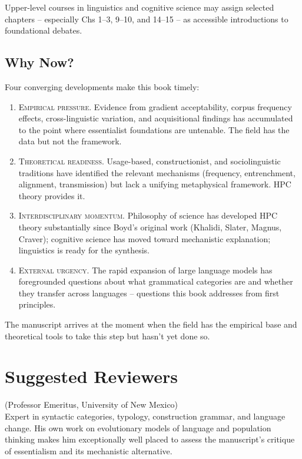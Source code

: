 \documentclass[11pt]{book}
\newcommand{\labelsc}[1]{{\mdseries\textsc{#1}}}
\begin{document}
Upper-level courses in linguistics and cognitive science may assign selected chapters -- especially Chs 1--3, 9--10, and 14--15 -- as accessible introductions to foundational debates.

\subsection*{Why Now?}

Four converging developments make this book timely:

\begin{enumerate}
  \item \labelsc{Empirical pressure.} Evidence from gradient acceptability, corpus frequency effects, cross-linguistic variation, and acquisitional findings has accumulated to the point where essentialist foundations are untenable. The field has the data but not the framework.
  \item \labelsc{Theoretical readiness.} Usage-based, constructionist, and sociolinguistic traditions have identified the relevant mechanisms (frequency, entrenchment, alignment, transmission) but lack a unifying metaphysical framework. HPC theory provides it.
  \item \labelsc{Interdisciplinary momentum.} Philosophy of science has developed HPC theory substantially since Boyd's original work (Khalidi, Slater, Magnus, Craver); cognitive science has moved toward mechanistic explanation; linguistics is ready for the synthesis.
  \item \labelsc{External urgency.} The rapid expansion of large language models has foregrounded questions about what grammatical categories are and whether they transfer across languages -- questions this book addresses from first principles.
\end{enumerate}

The manuscript arrives at the moment when the field has the empirical base and theoretical tools to take this step but hasn't yet done so.

\section{Suggested Reviewers}

\noindent\labelsc{William Croft} (Professor Emeritus, University of New Mexico)\\
Expert in syntactic categories, typology, construction grammar, and language change. His own work on evolutionary models of language and population thinking makes him exceptionally well placed to assess the manuscript's critique of essentialism and its mechanistic alternative.
\end{document}
